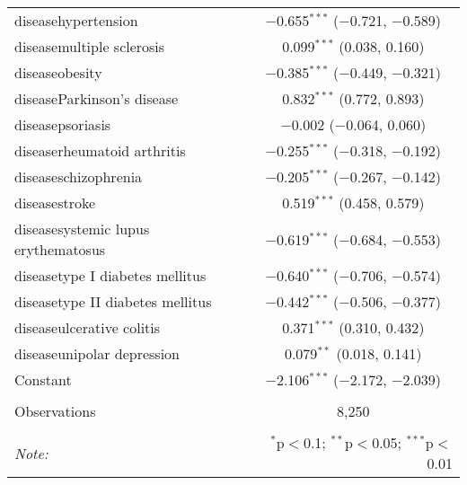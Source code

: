 \begin{table}[!htbp]
\begin{tabular}{@{\extracolsep{5pt}}lc}
  diseasehypertension & $-$0.655$^{***}$ ($-$0.721, $-$0.589) \\ 
  diseasemultiple sclerosis & 0.099$^{***}$ (0.038, 0.160) \\ 
  diseaseobesity & $-$0.385$^{***}$ ($-$0.449, $-$0.321) \\ 
  diseaseParkinson's disease & 0.832$^{***}$ (0.772, 0.893) \\ 
  diseasepsoriasis & $-$0.002 ($-$0.064, 0.060) \\ 
  diseaserheumatoid arthritis & $-$0.255$^{***}$ ($-$0.318, $-$0.192) \\ 
  diseaseschizophrenia & $-$0.205$^{***}$ ($-$0.267, $-$0.142) \\ 
  diseasestroke & 0.519$^{***}$ (0.458, 0.579) \\ 
  diseasesystemic lupus erythematosus & $-$0.619$^{***}$ ($-$0.684, $-$0.553) \\ 
  diseasetype I diabetes mellitus & $-$0.640$^{***}$ ($-$0.706, $-$0.574) \\ 
  diseasetype II diabetes mellitus & $-$0.442$^{***}$ ($-$0.506, $-$0.377) \\ 
  diseaseulcerative colitis & 0.371$^{***}$ (0.310, 0.432) \\ 
  diseaseunipolar depression & 0.079$^{**}$ (0.018, 0.141) \\ 
  Constant & $-$2.106$^{***}$ ($-$2.172, $-$2.039) \\ 
 \hline \\[-1.8ex] 
Observations & 8,250 \\ 
\hline 
\hline \\[-1.8ex] 
\textit{Note:}  & \multicolumn{1}{r}{$^{*}$p$<$0.1; $^{**}$p$<$0.05; $^{***}$p$<$0.01} \\ 
\end{tabular} 
\end{table} 
